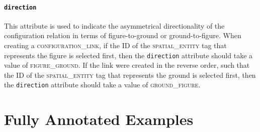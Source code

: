 \documentclass[11pt]{article}
\newcommand{\entity}[2]{[\textbf{\color{darkblue}#1}$_{se#2}$]}
\begin{document}



\paragraph{\texttt{direction}} %
\label{par:direction}
This attribute is used to indicate the asymmetrical directionality of the configuration relation in terms of figure-to-ground or ground-to-figure. When creating a \textsc{configuration\_link}, if the ID of the \textsc{spatial\_entity} tag that represents the figure is selected first, then the \texttt{direction} attribute should take a value of \textsc{figure\_ground}. If the link were created in the reverse order, such that the ID of the \textsc{spatial\_entity} tag that represents the ground is selected first, then the \texttt{direction} attribute should take a value of \textsc{ground\_figure}.






\section{Fully Annotated Examples} %
\label{sec:fully_annotated_examples}
\end{document}

